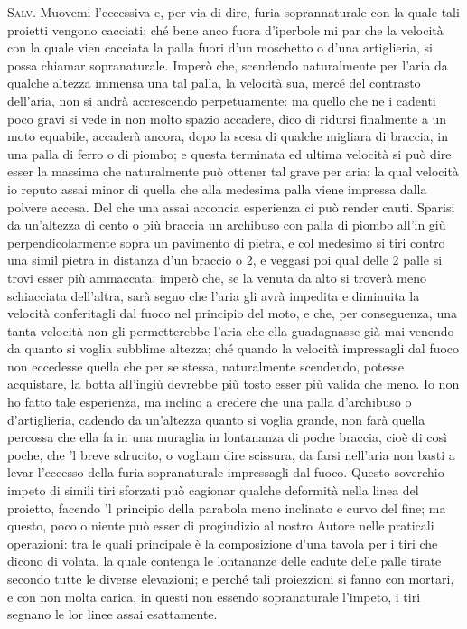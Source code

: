 \documentclass[11pt,twoside,openany]{book}
\newcommand{\speaker}[1]{\textcolor{rubric}{\textsc{#1}}\space}
\begin{document}
\speaker{Salv.} Muovemi l'eccessiva e, per via di dire, furia soprannaturale con la quale tali proietti vengono cacciati; ché bene anco fuora d'iperbole mi par che la velocità con la quale vien cacciata la palla fuori d'un moschetto o d'una artiglieria, si possa chiamar sopranaturale. Imperò che, scendendo naturalmente per l'aria da qualche altezza immensa una tal palla, la velocità sua, mercé del contrasto dell'aria, non si andrà accrescendo perpetuamente: ma quello che ne i cadenti poco gravi si vede in non molto spazio accadere, dico di ridursi finalmente a un moto equabile, accaderà ancora, dopo la scesa di qualche migliara di braccia, in una palla di ferro o di piombo; e questa terminata ed ultima velocità si può dire esser la massima che naturalmente può ottener tal grave per aria: la qual velocità io reputo assai minor di quella che alla medesima palla viene impressa dalla polvere accesa. Del che una assai acconcia esperienza ci può render cauti. Sparisi da un'altezza di cento o più braccia un archibuso con palla di piombo all'in giù perpendicolarmente sopra un pavimento di pietra, e col medesimo si tiri contro una simil pietra in distanza d'un braccio o 2, e veggasi poi qual delle 2 palle si trovi esser più ammaccata: imperò che, se la venuta da alto si troverà meno schiacciata dell'altra, sarà segno che l'aria gli avrà impedita e diminuita la velocità conferitagli dal fuoco nel principio del moto, e che, per conseguenza, una tanta velocità non gli permetterebbe l'aria che ella guadagnasse già mai venendo da quanto si voglia subblime altezza; ché quando la velocità impressagli dal fuoco non eccedesse quella che per se stessa, naturalmente scendendo, potesse acquistare, la botta all'ingiù devrebbe più tosto esser più valida che meno. Io non ho fatto tale esperienza, ma inclino a credere che una palla d'archibuso o d'artiglieria, cadendo da un'altezza quanto si voglia grande, non farà quella percossa che ella fa in una muraglia in lontananza di poche braccia, cioè di così poche, che 'l breve sdrucito, o vogliam dire scissura, da farsi nell'aria non basti a levar l'eccesso della furia sopranaturale impressagli dal fuoco. Questo soverchio impeto di simili tiri sforzati può cagionar qualche deformità nella linea del proietto, facendo 'l principio della parabola meno inclinato e curvo del fine; ma questo, poco o niente può esser di progiudizio al nostro Autore nelle praticali operazioni: tra le quali principale è la composizione d'una tavola per i tiri che dicono di volata, la quale contenga le lontananze delle cadute delle palle tirate secondo tutte le diverse elevazioni; e perché tali proiezzioni si fanno con mortari, e con non molta carica, in questi non essendo sopranaturale l'impeto, i tiri segnano le lor linee assai esattamente.
\end{document}
